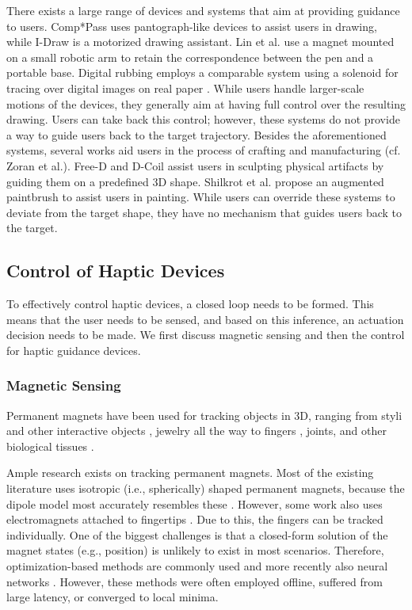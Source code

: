 There exists a large range of devices and systems that aim at providing guidance to users. Comp*Pass \cite{Nakagaki14} uses pantograph-like devices to assist users in drawing, while I-Draw \cite{Fernando14} is a motorized drawing assistant. Lin et al. \cite{Lin16} use a magnet mounted on a small robotic arm to retain the correspondence between the pen and a portable base. Digital rubbing employs a comparable system using a solenoid for tracing over digital images on real paper \cite{kim2008digital}. While users handle larger-scale motions of the devices, they generally aim at having full control over the resulting drawing. Users can take back this control; however, these systems do not provide a way to guide users back to the target trajectory. Besides the aforementioned systems, several works aid users in the process of crafting and manufacturing (cf. Zoran et al.\cite{zoran2014wise}). Free-D \cite{zoran2013freed} and D-Coil \cite{peng2015d} assist users in sculpting physical artifacts by guiding them on a predefined 3D shape. Shilkrot et al.\cite{Shilkrot2014} propose an augmented paintbrush to assist users in painting. While users can override these systems to deviate from the target shape, they have no mechanism that guides users back to the target.

\subsection{Control of Haptic Devices}
To effectively control haptic devices, a closed loop needs to be formed. This means that the user needs to be sensed, and based on this inference, an actuation decision needs to be made. We first discuss magnetic sensing and then the control for haptic guidance devices.

\subsubsection{Magnetic Sensing}
Permanent magnets have been used for tracking objects in 3D, ranging from styli and other interactive objects \cite{liang2012gausssense, kuo2016gaussmarbles}, jewelry \cite{ashbrook2011nenya} all the way to fingers \cite{han2007wearable}, joints, and other biological tissues \cite{bhadra2002implementation, tarantino2017myokinetic}.

Ample research exists on tracking permanent magnets. Most of the existing literature uses isotropic (i.e., spherically) shaped permanent magnets, because the dipole model most accurately resembles these \cite{jackson2007classical}. However, some work also uses electromagnets attached to fingertips \cite{chen2016finexus}. Due to this, the fingers can be tracked individually. One of the biggest challenges is that a closed-form solution of the magnet states (e.g., position) is unlikely to exist in most scenarios. Therefore, optimization-based methods are commonly used \cite{schlageter2001tracking, taylor2019low} and more recently also neural networks \cite{russel2017neural}. However, these methods were often employed offline, suffered from large latency, or converged to local minima. 


